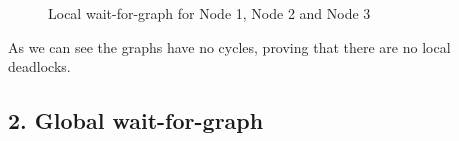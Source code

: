 \documentclass{article}      %
\begin{document}
\begin{figure}[ht]
\centering

{%
\setlength{\fboxsep}{5pt}%
%
%
%
}%

\caption{Local wait-for-graph for Node 1, Node 2 and Node 3 \label{overflow}}
\end{figure}

As we can see the graphs have no cycles, proving that there are no local deadlocks.\\

\subsection* {2. Global wait-for-graph}
\end{document}
